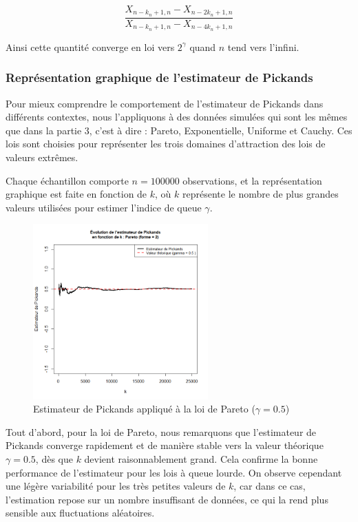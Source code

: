 \documentclass{article}
\theoremstyle{plain}
\theoremstyle{definition}
\theoremstyle{plain}
\begin{document}
\[
\frac{X_{n-k_n+1,n} - X_{n-2k_n+1,n}}{X_{n-k_n+1,n} - X_{n-4k_n+1,n}}
\]

\noindent Ainsi cette quantité converge en loi vers $2^{\gamma}$ quand $n$ tend vers l’infini.

\subsubsection{Représentation graphique de l’estimateur de Pickands}

\noindent Pour mieux comprendre le comportement de l’estimateur de Pickands dans différents contextes, nous l’appliquons à des données simulées qui sont les mêmes que dans la partie 3, c'est à dire : Pareto, Exponentielle, Uniforme et Cauchy. Ces lois sont choisies pour représenter les trois domaines d’attraction des lois de valeurs extrêmes.

\noindent Chaque échantillon comporte $n = 100000$ observations, et la représentation graphique est faite en fonction de $k$, où \(k\) représente le nombre de plus grandes valeurs utilisées pour estimer l’indice de queue \(\gamma\).

\begin{figure}[H]
    \centering
    \includegraphics[width=0.6\textwidth]{./Evolution des estimateurs/pickands/estimateur_pickands_pareto.png}
    \caption{Estimateur de Pickands appliqué à la loi de Pareto ($\gamma = 0.5$)}
\end{figure}
\noindent Tout d'abord, pour la loi de Pareto, nous remarquons que l'estimateur de Pickands converge rapidement et de manière stable vers la valeur théorique \(\gamma = 0.5\), dès que \(k\) devient raisonnablement grand. Cela confirme la bonne performance de l’estimateur pour les lois à queue lourde. On observe cependant une légère variabilité pour les très petites valeurs de \(k\), car dans ce cas, l’estimation repose sur un nombre insuffisant de données, ce qui la rend plus sensible aux fluctuations aléatoires.
\end{document}
